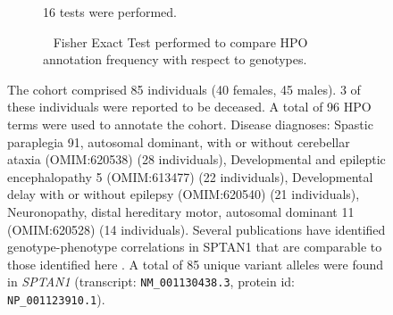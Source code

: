 \begin{figure}[htbp]
\begin{subfigure}[b]{0.95\textwidth}
{        16 tests were performed. }
\end{subfigure}
\vspace{2em}
\begin{subfigure}[b]{0.95\textwidth}
\centering
{}
\captionsetup{justification=raggedright,singlelinecheck=false}
\caption{             Fisher Exact Test performed to compare HPO annotation frequency with respect to genotypes. }
\end{subfigure}

\vspace{2em}

\caption{ The cohort comprised 85 individuals (40 females, 45 males). 3 of these individuals were reported to be deceased. A total of 96 HPO terms were used to annotate the cohort. Disease diagnoses: Spastic paraplegia 91, autosomal dominant, with or without cerebellar ataxia (OMIM:620538) (28 individuals), Developmental and epileptic encephalopathy 5 (OMIM:613477) (22 individuals), Developmental delay with or without epilepsy (OMIM:620540) (21 individuals), Neuronopathy, distal hereditary motor, autosomal dominant 11 (OMIM:620528) (14 individuals). Several publications have identified genotype-phenotype correlations in SPTAN1 that are comparable to those
identified here \cite{PMID_25631096,PMID_36331550,PMID_35150594}.
 A total of 85 unique variant alleles were found in \textit{SPTAN1} (transcript: \texttt{NM\_001130438.3}, protein id: \texttt{NP\_001123910.1}).}
\end{figure}
